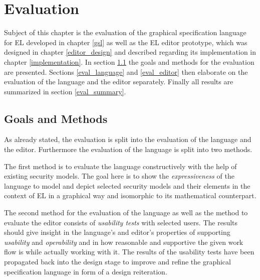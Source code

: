 \documentclass[twoside, openright, 12pt]{book}
\begin{document}



\cleardoublepage
\chapter{Evaluation}
\label{evaluation}
Subject of this chapter is the evaluation of the graphical specification language for EL developed in chapter \ref{gsl} as well as the EL editor prototype, which was designed in chapter \ref{editor_design} and described regarding its implementation in chapter \ref{implementation}.
In section \ref{eval_goals} the goals and methods for the evaluation are presented.
Sections \ref{eval_language} and \ref{eval_editor} then elaborate on the evaluation of the language and the editor separately.
Finally all results are summarized in section \ref{eval_summary}.



\section{Goals and Methods}
\label{eval_goals}
As already stated, the evaluation is split into the evaluation of the language and the editor.
Furthermore the evaluation of the language is split into two methods.

The first method is to evaluate the language constructively with the help of existing security models.
The goal here is to show the \textit{expressiveness} of the language to model and depict selected security models and their elements in the context of EL in a graphical way and isomorphic to its mathematical counterpart.

The second method for the evaluation of the language as well as the method to evaluate the editor consists of \textit{usability tests} with selected users.
The results should give insight in the language's and editor's properties of supporting \textit{usability} and \textit{operability} and in how reasonable and supportive the given work flow is while actually working with it.
The results of the usability tests have been propagated back into the design stage to improve and refine the graphical specification language in form of a design reiteration.
\end{document}
